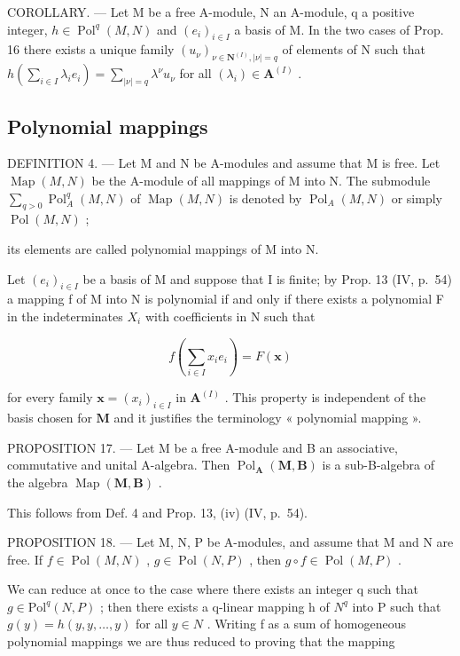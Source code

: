 COROLLARY. --- Let M be a free A-module, N an A-module, q a positive integer, \(h \in \operatorname{Pol}^{q}(M, N)\) and \((e_{i})_{i \in I}\) a basis of M. In the two cases of Prop. 16 there exists a unique family \((u_{\nu})_{\nu \in \mathbf{N}^{(I)}, |\nu| = q}\) of elements of N such that \(h\left(\sum_{i \in I} \lambda_{i} e_{i}\right) = \sum_{|\nu| = q} \lambda^{\nu} u_{\nu}\) for all \((\lambda_{i}) \in \mathbf{A}^{(I)}\) .

\subsection{Polynomial mappings}

DEFINITION 4. --- Let M and N be A-modules and assume that M is free. Let \(\operatorname{Map}(M, N)\) be the A-module of all mappings of M into N. The submodule \(\sum_{q > 0} \operatorname{Pol}_{A}^{q}(M, N)\) of \(\operatorname{Map}(M, N)\) is denoted by \(\operatorname{Pol}_{A}(M, N)\) or simply \(\operatorname{Pol}(M, N)\) ;

its elements are called polynomial mappings of M into N.

Let \((e_{i})_{i\in I}\) be a basis of M and suppose that I is finite; by Prop. 13 (IV, p.~54) a mapping f of M into N is polynomial if and only if there exists a polynomial F in the indeterminates \(X_{i}\) with coefficients in N such that

\[
f \left(\sum_ {i \in I} x _ {i} e _ {i}\right) = F (\mathbf {x})
\]

for every family \(\mathbf{x} = (x_i)_{i\in I}\) in \(\mathbf{A}^{(I)}\) . This property is independent of the basis chosen for \(\mathbf{M}\) and it justifies the terminology « polynomial mapping ».

PROPOSITION 17. --- Let M be a free A-module and B an associative, commutative and unital A-algebra. Then \(\operatorname{Pol}_{\mathbf{A}}(\mathbf{M}, \mathbf{B})\) is a sub-B-algebra of the algebra \(\operatorname{Map}(\mathbf{M}, \mathbf{B})\) .

This follows from Def. 4 and Prop. 13, (iv) (IV, p.~54).

PROPOSITION 18. --- Let M, N, P be A-modules, and assume that M and N are free. If \(f \in \operatorname{Pol}(M, N)\) , \(g \in \operatorname{Pol}(N, P)\) , then \(g \circ f \in \operatorname{Pol}(M, P)\) .

We can reduce at once to the case where there exists an integer q such that \(g \in \text{Pol}^{q}(N, P)\) ; then there exists a q-linear mapping h of \(N^{q}\) into P such that \(g(y) = h(y, y, \ldots, y)\) for all \(y \in N\) . Writing f as a sum of homogeneous polynomial mappings we are thus reduced to proving that the mapping

